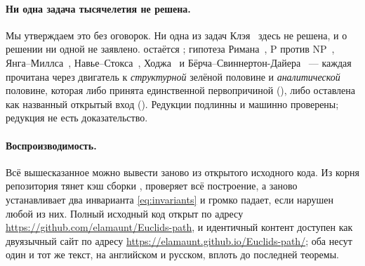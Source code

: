 \paragraph{Ни одна задача тысячелетия не решена.}
Мы утверждаем это без оговорок. Ни одна из задач Клэя~\cite{millennium} здесь не решена, и о решении
ни одной не заявлено.  остаётся ; гипотеза
Римана~\cite{clay-rh}, $\mathrm{P}$ против $\mathrm{NP}$~\cite{clay-pnp},
Янга--Миллса~\cite{clay-ym}, Навье--Стокса~\cite{clay-ns}, Ходжа~\cite{clay-hodge} и
Бёрча--Свиннертон-Дайера~\cite{clay-bsd} --- каждая прочитана через двигатель к \emph{структурной}
зелёной половине и \emph{аналитической} половине, которая либо принята единственной первопричиной
(\yellow{}), либо оставлена как названный открытый вход (\red{}). Редукции подлинны и машинно
проверены; редукция не есть доказательство.

\paragraph{Воспроизводимость.}
Всё вышесказанное можно вывести заново из открытого исходного кода. Из корня репозитория
 тянет кэш сборки ,  проверяет всё
построение, а  заново устанавливает два инварианта
\cref{eq:invariants} и громко падает, если нарушен любой из них. Полный исходный код открыт по
адресу \url{https://github.com/elamaunt/Euclids-path}, и идентичный контент доступен как двуязычный
сайт по адресу \url{https://elamaunt.github.io/Euclids-path/}; оба несут один и тот же текст, на
английском и русском, вплоть до последней теоремы.
